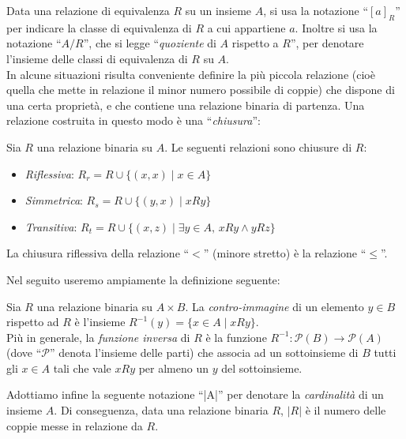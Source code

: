 Data una relazione di equivalenza $R$ su un insieme $A$, si usa la notazione ``$[a]_R$'' per indicare la classe di equivalenza di $R$ a cui appartiene $a$. Inoltre si usa la notazione ``$A/R$'', che si legge ``\emph{quoziente} di $A$ rispetto a $R$'', per denotare l'insieme delle classi di equivalenza di $R$ su $A$.\\
In alcune situazioni risulta conveniente definire la più piccola relazione (cioè quella che mette in relazione il minor numero possibile di coppie) che dispone di una certa proprietà, e che contiene una relazione binaria di partenza. Una relazione costruita in questo modo è una ``\emph{chiusura}'':
\begin{definition}
	Sia $R$ una relazione binaria su $A$. Le seguenti relazioni sono chiusure di $R$:
    \begin{itemize}
        \item \emph{Riflessiva}: $R_r = R \cup \{(x,x) \mid x \in A\}$
        \item \emph{Simmetrica}: $R_s = R \cup \{(y,x) \mid x R y\}$
        \item \emph{Transitiva}: $R_t = R \cup \{(x,z) \mid \exists y \in A,\, x R y \land y R z\}$
    \end{itemize}
\end{definition}
\begin{example}
    La chiusura riflessiva della relazione ``$<$'' (minore stretto) è la relazione ``$\leq$''.
\end{example}
Nel seguito useremo ampiamente la definizione seguente:
\begin{definition}
    Sia $R$ una relazione binaria su $A \times B$. La \emph{contro-immagine} di un elemento $y \in B$ rispetto ad $R$ è l'insieme $R^{-1}(y) = \{x \in A \mid x R y\}$.\\
    Più in generale, la \emph{funzione inversa} di $R$ è la funzione $R^{-1} : \mathcal{P}(B) \to \mathcal{P}(A)$ (dove ``$\mathcal{P}$'' denota l'insieme delle parti) che associa ad un sottoinsieme di $B$ tutti gli $x \in A$ tali che vale $x R y$ per almeno un $y$ del sottoinsieme.
\end{definition}
Adottiamo infine la seguente notazione ``|A|'' per denotare la \emph{cardinalità} di un insieme $A$. Di conseguenza, data una relazione binaria $R$, $|R|$ è il numero delle coppie messe in relazione da $R$.


